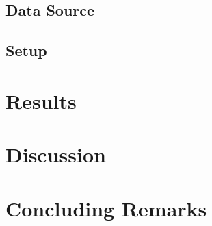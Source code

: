 \documentclass[12pt]{article}
\begin{document}
		\subsection{Data Source}
		
		\subsection{Setup}
		
		
		\section{Results}
		\label{SEC3}
		
		\section{Discussion}
		\label{SEC4}
		
		
		\section{Concluding Remarks}
		\label{SEC5}
		
		
			
	
\end{document}
